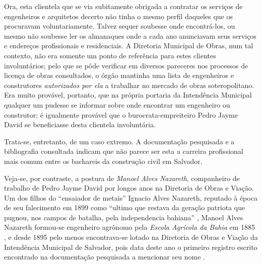 Ora, esta clientela que se via subitamente obrigada a contratar os serviços de engenheiros e arquitetos decerto não tinha o mesmo perfil daqueles que os procuravam voluntariamente. Talvez sequer soubesse onde encontrá-los, ou mesmo não soubesse ler os almanaques onde a cada ano anunciavam seus serviços e endereços profissionais e residenciais. A Diretoria Municipal de Obras, num tal contexto, não era somente um ponto de referência para estes clientes involuntários; pelo que se pôde verificar em diversos pareceres nos processos de licença de obras consultados, o órgão mantinha uma lista de engenheiros e construtores \textit{autorizados por ela} a trabalhar no mercado de obras soteropolitano. Era muito provável, portanto, que na própria portaria da Intendência Municipal qualquer um pudesse se informar sobre onde encontrar um engenheiro ou construtor; é igualmente provável que o burocrata-empreiteiro Pedro Jayme David se beneficiasse desta clientela involuntária.

Trata-se, entretanto, de um caso extremo. A documentação pesquisada e a bibliografia consultada indicam que não parece ser esta a carreira profissional mais comum entre os bachareis da construção civil em Salvador.

Veja-se, por contraste, a postura de \textit{Manoel Alves Nazareth}, companheiro de trabalho de Pedro Jayme David por longos anos na Diretoria de Obras e Viação. Um dos filhos do ``ensaiador de metais'' Ignacio Alves Nazareth, reputado à época de seu falecimento em 1899 como ``ultimo que restava da geração patriota que pugnou, nos campos de batalha, pela independencia bahiana'' \cite{apontamentos_1899}, Manoel Alves Nazareth formou-se engenheiro agrônomo pela \textit{Escola Agrícola da Bahia} em 1885 \cite[p.~141]{araujo_agronomia_2010}, e desde 1895 pelo menos encontrava-se lotado na Diretoria de Obras e Viação da Intendência Municipal de Salvador, pois data deste ano o primeiro registro escrito encontrado na documentação pesquisada a mencionar seu nome \cite{salvador_relatorio_1895}. 


